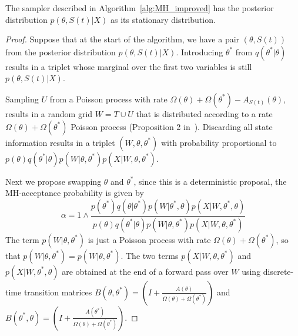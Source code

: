 \begin{proposition}
  The sampler described in Algorithm~\ref{alg:MH_improved} has the posterior
  distribution $p(\theta,S(t)|X)$ as its stationary distribution.
\end{proposition}
\begin{proof}
  Suppose that at the start of the algorithm, we have a pair $(\theta,S(t))$ from
  the posterior distribution $p(\theta,S(t)|X)$. Introducing $\theta^*$
  from $q(\theta^*|\theta)$ results in a triplet whose marginal over the first
  two variables is still $p(\theta,S(t)|X)$.

  Sampling $U$ from a Poisson process with rate $\Omega(\theta) +
  \Omega(\theta^*) - A_{S(t)}(\theta)$, results in a random grid $W = T \cup U$
  that is distributed according to a rate $\Omega(\theta) + \Omega(\theta^*)$
  Poisson process (Proposition 2 in~\cite{RaoTeh13}). Discarding all state 
  information results in a triplet $(W,\theta,\theta^*)$ with probability
  proportional to $p(\theta)q(\theta^*|\theta)p(W|\theta,\theta^*)
  p(X|W,\theta,\theta^*)$.

Next we propose swapping $\theta$ and $\theta^*$, since this
is a deterministic proposal, the MH-acceptance probability is given by
$$\alpha = 1 \wedge \frac{p(\theta^*)q(\theta|\theta^*)p(W|\theta^*,\theta)
p(X|W,\theta^*,\theta)}{p(\theta)q(\theta^*|\theta)p(W|\theta,\theta^*)
p(X|W,\theta,\theta^*)}$$
The term $p(W|\theta,\theta^*)$ is just a Poisson process with rate $\Omega(\theta)+
\Omega(\theta^*)$, so that $p(W|\theta,\theta^*) = p(W|\theta,\theta^*)$. The
two terms $p(X|W,\theta,\theta^*)$ and $p(X|W,\theta^*,\theta)$ are obtained
at the end of a forward pass over $W$ using discrete-time transition matrices
$B(\theta,\theta^*) = \left(I + \frac{A(\theta)}{\Omega(\theta)+\Omega(\theta^*)}\right)$ 
and $B(\theta^*,\theta) = \left(I + \frac{A(\theta^*)}{\Omega(\theta)+\Omega(\theta^*)}\right)$. 


\end{proof}
